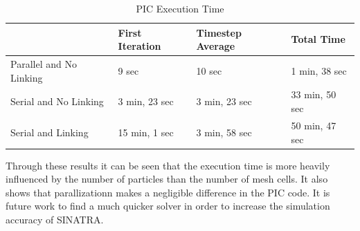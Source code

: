\begin{table}
\caption{PIC Execution Time}
\label{tab:pic_time}
\vspace{0.3cm}
\begin{center}
\begin{tabular}{|l|l|l|l|}
\hline
                             & First Iteration & Timestep Average & Total Time     \\ \hline
Parallel and No Linking & 9 sec           & 10 sec           & 1 min, 38 sec  \\ \hline
Serial and No Linking   & 3 min, 23 sec   & 3 min, 23 sec    & 33 min, 50 sec \\ \hline
Serial and Linking      & 15 min, 1 sec   &  3 min, 58 sec   &   50 min, 47 sec             \\ \hline
\end{tabular}
\end{center}
\end{table}

\indent Through these results it can be seen that the execution time is more heavily influenced by the number of particles than the number of mesh cells. It also shows that parallizationn makes a negligible difference in the PIC code. It is future work to find a much quicker solver in order to increase the simulation accuracy of SINATRA. 
